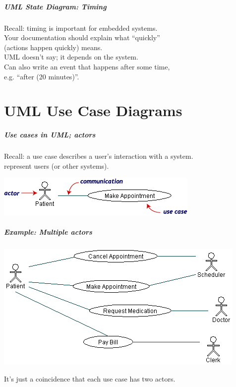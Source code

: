 \begin{frame}
\frametitle{UML State Diagram: Timing}

\begin{changemargin}{1cm}

Recall: timing is important for embedded systems.\\[1em]

Your documentation should explain what ``quickly'' \\
\qquad (actions happen quickly) means.\\

UML doesn't say; it depends on the system. \\[1em]

Can also
write an event that happens after some time,\\
\qquad  e.g. ``after (20
minutes)''. 
\end{changemargin}
\end{frame}

\part{UML Use Case Diagrams}
\frame{\partpage}

\begin{frame}
\frametitle{Use cases in UML; actors}

Recall: a use case describes a user's
interaction with a system. \\[1em]

 represent users (or other systems).

\begin{center}
\includegraphics[width=.5\textwidth]{images/usecase-explanation.png}
\end{center}

\end{frame}

\begin{frame}
\frametitle{Example: Multiple actors}

\begin{center}
\includegraphics[width=.45\textwidth]{images/usecase-multiple.png}
\end{center}

\begin{changemargin}{1cm}

It's just a coincidence that each use case has two actors.
\end{changemargin}
\end{frame}

